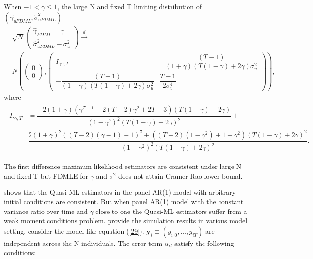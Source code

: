 \documentclass[12pt,a4paper,hyperref]{article}
\begin{document}
When $-1< \gamma\leq 1$, the large N and fixed T limiting distribution of $\left( \hat{\gamma}_{uFDML}, \hat{\sigma}^{2}_{uFDML} \right)$
\begin{align}
&\sqrt{N}\begin{pmatrix}
\hat{\gamma}_{FDML}-\gamma \\
\hat{\sigma}^{2}_{uFDML}-\sigma^{2}_{u}
\end{pmatrix}
\stackrel{d}{\rightarrow} \\
&N \left(
\begin{pmatrix}
0 \\
0
\end{pmatrix}
,
\begin{pmatrix}
I_{\gamma\gamma,T} & -\dfrac{(T-1)}{(1+\gamma)(T(1-\gamma)+2\gamma)\sigma^{2}_{u}} \\
-\dfrac{(T-1)}{(1+\gamma)(T(1-\gamma)+2\gamma)\sigma^{2}_{u}} & \dfrac{T-1}{2\sigma^{4}_{u}}
\end{pmatrix}
\right),
\end{align}
where
\begin{align}
\begin{split}
I_{\gamma\gamma,T}&=\dfrac{-2(1+\gamma)(\gamma^{T-1}-2(T-2)\gamma^{2}+2T-3)(T(1-\gamma)+2\gamma)}{(1-\gamma^{2})^{2}(T(1-\gamma)+2\gamma)^{2}}+ \\
&\dfrac{2(1+\gamma)^{2}((T-2)(\gamma-1)-1)^{2}+((T-2)(1-\gamma^{2})+1+\gamma^{2})(T(1-\gamma)+2\gamma)^{2}}{(1-\gamma^{2})^{2}(T(1-\gamma)+2\gamma)^{2}}.
\end{split}
\end{align}


The first difference maximum likelihood estimators are consistent under large N and fixed T but FDMLE for $\gamma$ and $\sigma^{2}$ does not attain Cramer-Rao lower bound.

\citet{Kruiniger:2013} shows that the Quasi-ML estimators in the panel AR(1) model with arbitrary initial conditions are consistent. But when panel AR(1) model with the constant variance ratio over time and $\gamma$ close to one the Quasi-ML estimators suffer from a weak moment conditions problem. \citet{Kruiniger:2013} provide the simulation results in various model setting. \citet{Kruiniger:2013} consider the model like equation (\ref{29}). $\boldsymbol{y}_{i} \equiv \left( y_{i,0},\ldots, y_{iT}  \right)$ are independent across the N individuals. The error term $u_{it}$ satisfy the following conditions:
\end{document}
